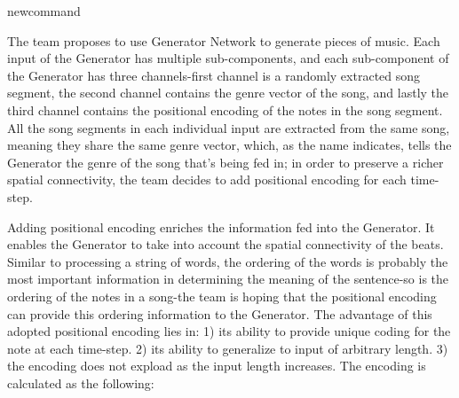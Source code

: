 \usepackage{amsmath}

newcommand\norm[1]{\left\lVert#1\right\rVert}
\begin{par}
    \par The team proposes to use Generator Network to generate pieces of music. Each input of the Generator has 
    multiple sub-components, and each sub-component of the Generator has three channels-first channel is a randomly 
    extracted song segment, the second channel contains the genre vector of the song, and lastly the third channel contains the positional
    encoding of the notes in the song segment. All the song segments in each individual input are extracted from the same song, meaning
    they share the same genre vector, which, as the name indicates, tells the Generator the genre of the song that's being fed in; in order
    to preserve a richer spatial connectivity, the team decides to add positional encoding for each time-step. 
    
    Adding positional encoding enriches the information fed into the Generator. It enables the Generator to take into account the spatial 
    connectivity of the beats. Similar to processing a string of words, the ordering of the words is probably the most important information in
    determining the meaning of the sentence-so is the ordering of the notes in a song-the team is hoping that the positional encoding can provide
    this ordering information to the Generator. The advantage of this adopted positional encoding lies in: 1) its ability to provide unique coding
    for the note at each time-step. 2) its ability to generalize to input of arbitrary length. 3) the encoding does not expload as the input length
    increases. The encoding is calculated as the following:

    
    

\end{par}